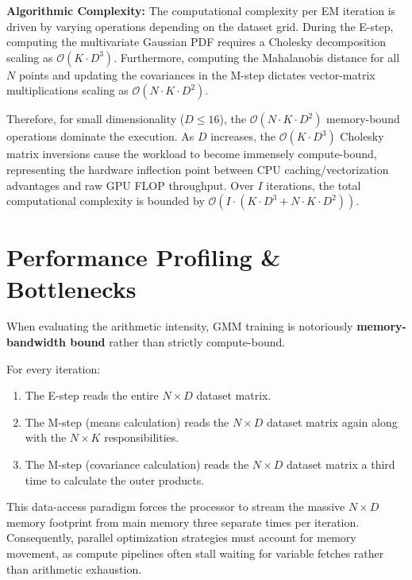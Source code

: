 \documentclass[10pt]{article}
\begin{document}
\textbf{Algorithmic Complexity:} The computational complexity per EM iteration is driven by varying operations depending on the dataset grid. During the E-step, computing the multivariate Gaussian PDF requires a Cholesky decomposition scaling as $\mathcal{O}(K \cdot D^3)$. Furthermore, computing the Mahalanobis distance for all $N$ points and updating the covariances in the M-step dictates vector-matrix multiplications scaling as $\mathcal{O}(N \cdot K \cdot D^2)$.

Therefore, for small dimensionality ($D \le 16$), the $\mathcal{O}(N \cdot K \cdot D^2)$ memory-bound operations dominate the execution. As $D$ increases, the $\mathcal{O}(K \cdot D^3)$ Cholesky matrix inversions cause the workload to become immensely compute-bound, representing the hardware inflection point between CPU caching/vectorization advantages and raw GPU FLOP throughput. Over $I$ iterations, the total computational complexity is bounded by $\mathcal{O}(I \cdot (K \cdot D^3 + N \cdot K \cdot D^2))$.

\section{Performance Profiling \& Bottlenecks}
When evaluating the arithmetic intensity, GMM training is notoriously \textbf{memory-bandwidth bound} rather than strictly compute-bound.

For every iteration:
\begin{enumerate}
    \item The E-step reads the entire $N \times D$ dataset matrix.
    \item The M-step (means calculation) reads the $N \times D$ dataset matrix again along with the $N \times K$ responsibilities.
    \item The M-step (covariance calculation) reads the $N \times D$ dataset matrix a third time to calculate the outer products.
\end{enumerate}

This data-access paradigm forces the processor to stream the massive $N \times D$ memory footprint from main memory three separate times per iteration. Consequently, parallel optimization strategies must account for memory movement, as compute pipelines often stall waiting for variable fetches rather than arithmetic exhaustion.
\end{document}
